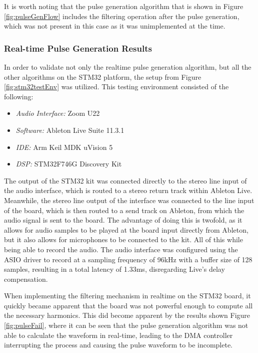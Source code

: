 It is worth noting that the pulse generation algorithm that is shown in Figure \ref{fig:pulseGenFlow} includes the filtering operation after the pulse generation, which was not present in this case as it was unimplemented at the time.

\subsubsection{Real-time Pulse Generation Results} 

In order to validate not only the realtime pulse generation algorithm, but all the other algorithms on the STM32 platform, the setup from Figure \ref{fig:stm32testEnv} was utilized. This testing environment consisted of the following:

\begin{itemize}
    \item {\it Audio Interface: } Zoom U22
    \item {\it Software: } Ableton Live Suite 11.3.1
    \item {\it IDE:} Arm Keil MDK uVision 5
    \item {\it DSP: } STM32F746G Discovery Kit
\end{itemize}

The output of the STM32 kit was connected directly to the stereo line input of the audio interface, which is routed to a stereo return track within Ableton Live. Meanwhile, the stereo line output of the interface was connected to the line input of the board, which is then routed to a send track on Ableton, from which the audio signal is sent to the board. The advantage of doing this is twofold, as it allows for audio samples to be played at the board input directly from Ableton, but it also allows for microphones to be connected to the kit. All of this while being able to record the audio. The audio interface was configured using the ASIO driver to record at a sampling frequency of 96kHz with a buffer size of 128 samples, resulting in a total latency of 1.33ms, disregarding Live's delay compensation.  

When implementing the filtering mechanism in realtime on the STM32 board, it quickly became apparent that the board was not powerful enough to compute all the necessary harmonics. This did become apparent by the results shown Figure \ref{fig:pulseFail}, where it can be seen that the pulse generation algorithm was not able to calculate the waveform in real-time, leading to the DMA controller interrupting the process and causing the pulse waveform to be incomplete. 


